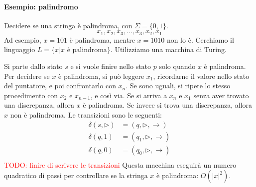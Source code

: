 \paragraph{Esempio: palindromo} Decidere se una stringa è palindroma, con $\Sigma = \{0,1\}$.
$$
    x_1,x_2,x_3,\dots,x_3,x_2,x_1
$$
Ad esempio, $x=101$ è palindroma, mentre $x=1010$ non lo è. Cerchiamo il linguaggio $L=\{x|x \text{ è palindroma}\}$. Utilizziamo una macchina di Turing.
\begin{center}
\end{center}
Si parte dallo stato $s$ e si vuole finire nello stato $p$ solo quando $x$ è palindroma. Per decidere se $x$ è palindroma, si può leggere $x_1$, ricordarne il valore nello stato del puntatore, e poi confrontarlo con $x_n$. Se sono uguali, si ripete lo stesso procedimento con $x_2$ e $x_{n-1}$, e così via. Se si arriva a $x_n$ e $x_1$ senza aver trovato una discrepanza, allora $x$ è palindroma. Se invece si trova una discrepanza, allora $x$ non è palindroma. Le transizioni sono le seguenti:
\begin{align*}
    \delta(s,\rhd) &= (q,\rhd,\to)\\
    \delta(q,1) &= (q_1,\rhd,\to)\\
    \delta(q,0) &= (q_0,\rhd,\to)\\
\end{align*}
\textcolor{Red}{TODO: finire di scrivere le transizioni}
Questa macchina eseguirà un numero quadratico di passi per controllare se la stringa $x$ è palindroma: $O(|x|^2)$.\medskip

